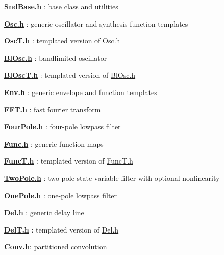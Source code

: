 {\bfseries \hyperlink{_snd_base_8h}{Snd\+Base.\+h}} \+: base class and utilities

{\bfseries \hyperlink{_osc_8h}{Osc.\+h}} \+: generic oscillator and synthesis function templates

{\bfseries \hyperlink{_osc_t_8h}{Osc\+T.\+h}} \+: templated version of \hyperlink{_osc_8h}{Osc.\+h}

{\bfseries \hyperlink{_bl_osc_8h}{Bl\+Osc.\+h}} \+: bandlimited oscillator

{\bfseries \hyperlink{_bl_osc_t_8h}{Bl\+Osc\+T.\+h}} \+: templated version of \hyperlink{_bl_osc_8h}{Bl\+Osc.\+h}

{\bfseries \hyperlink{_env_8h}{Env.\+h}} \+: generic envelope and function templates

{\bfseries \hyperlink{_f_f_t_8h}{F\+F\+T.\+h}} \+: fast fourier transform

{\bfseries \hyperlink{_four_pole_8h}{Four\+Pole.\+h}} \+: four-\/pole lowpass filter

{\bfseries \hyperlink{_func_8h}{Func.\+h}} \+: generic function maps

{\bfseries \hyperlink{_func_t_8h}{Func\+T.\+h}} \+: templated version of \hyperlink{_func_t_8h}{Func\+T.\+h}

{\bfseries \hyperlink{_two_pole_8h}{Two\+Pole.\+h}} \+: two-\/pole state variable filter with optional nonlinearity

{\bfseries \hyperlink{_one_pole_8h}{One\+Pole.\+h}} \+: one-\/pole lowpass filter

{\bfseries \hyperlink{_del_8h}{Del.\+h}} \+: generic delay line

{\bfseries \hyperlink{_del_t_8h}{Del\+T.\+h}} \+: templated version of \hyperlink{_del_8h}{Del.\+h}

{\bfseries \hyperlink{_conv_8h}{Conv.\+h}}\+: partitioned convolution 